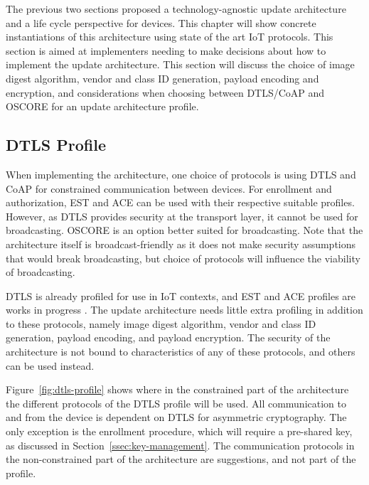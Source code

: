 \documentclass[0-thesis.tex]{subfiles}
\begin{document}
\label{chap:profiles}
The previous two sections proposed a technology-agnostic update architecture and a life
cycle perspective for devices. This chapter will show concrete instantiations of this
architecture using state of the art IoT protocols. This section is aimed at implementers
needing to make decisions about how to implement the update architecture. This section
will discuss the choice of image digest algorithm, vendor and class ID generation, payload
encoding and encryption, and considerations when choosing between DTLS/CoAP and OSCORE for
an update architecture profile.

\subsection{DTLS Profile}
\label{ssec:dtls-profile}
When implementing the architecture, one choice of protocols is using DTLS and CoAP for
constrained communication between devices. For enrollment and authorization, EST and ACE
can be used with their respective suitable profiles. However, as DTLS provides security at
the transport layer, it cannot be used for broadcasting. OSCORE is an option better suited
for broadcasting. Note that the architecture itself is broadcast-friendly as it does not
make security assumptions that would break broadcasting, but choice of protocols will
influence the viability of broadcasting.

DTLS is already profiled for use in IoT contexts, and EST and ACE profiles are works in
progress \parencite{rfc7925, est-coaps, ace-dtls-profile}. The update architecture needs
little extra profiling in addition to these protocols, namely image digest algorithm,
vendor and class ID generation, payload encoding, and payload encryption. The security of
the architecture is not bound to characteristics of any of these protocols, and others can
be used instead.

Figure~\ref{fig:dtls-profile} shows where in the constrained part of the architecture the
different protocols of the DTLS profile will be used. All communication to and from the
device is dependent on DTLS for asymmetric cryptography. The only exception is the
enrollment procedure, which will require a pre-shared key, as discussed in
Section~\ref{ssec:key-management}. The communication protocols in the non-constrained part
of the architecture are suggestions, and not part of the profile.
\end{document}
